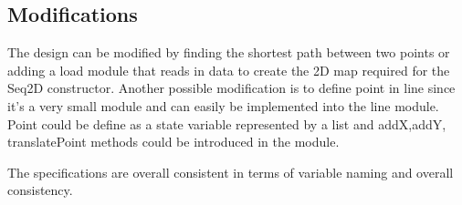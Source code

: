 \documentclass[12pt]{article}
\begin{document}
\subsection{Modifications}

The design can be modified by finding the shortest path between two points or adding a load module that reads in data to create the 2D map required for the Seq2D constructor. Another possible modification is to define point in line since it's a very small module and can easily be implemented into the line module. Point could be define as a state variable represented by a list and addX,addY, translatePoint methods could be introduced in the module.	

  
The specifications are overall consistent in terms of variable naming and overall consistency. 
\end{document}
